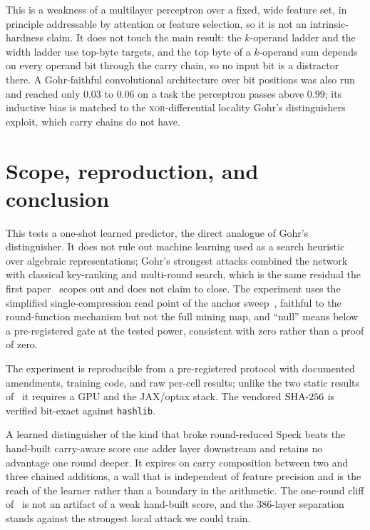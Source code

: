\documentclass[11pt]{article}
\begin{document}
This is a weakness of a multilayer perceptron over a fixed, wide feature
set, in principle addressable by attention or feature selection, so it is
not an intrinsic-hardness claim. It does not touch the main result: the
$k$-operand ladder and the width ladder use top-byte targets, and the top
byte of a $k$-operand sum depends on every operand bit through the carry
chain, so no input bit is a distractor there. A Gohr-faithful
convolutional architecture over bit positions was also run and reached only
$0.03$ to $0.06$ on a task the perceptron passes above $0.99$; its
inductive bias is matched to the \textsc{xor}-differential locality Gohr's
distinguishers exploit, which carry chains do not have.

\section{Scope, reproduction, and conclusion}\label{sec:scope}

This tests a one-shot learned predictor, the direct analogue of Gohr's
distinguisher. It does not rule out machine learning used as a search
heuristic over algebraic representations; Gohr's strongest attacks combined
the network with classical key-ranking and multi-round search, which is the
same residual the first paper~\cite{paperI} scopes out and does not claim
to close. The experiment uses the simplified single-compression read point
of the anchor sweep~\cite{paperII}, faithful to the round-function
mechanism but not the full mining map, and ``null'' means below a
pre-registered gate at the tested power, consistent with zero rather than a
proof of zero.

The experiment is reproducible from a pre-registered protocol with
documented amendments, training code, and raw per-cell results; unlike the
two static results of~\cite{paperII} it requires a GPU and the JAX/optax
stack. The vendored $\mathrm{SHA\text{-}256}$ is verified bit-exact against \texttt{hashlib}.

A learned distinguisher of the kind that broke round-reduced Speck beats
the hand-built carry-aware score one adder layer downstream and retains no
advantage one round deeper. It expires on carry composition
between two and three chained additions, a wall that is independent of
feature precision and is the reach of the learner rather than a boundary in
the arithmetic. The one-round cliff of~\cite{paperII} is not an artifact of
a weak hand-built score, and the $386$-layer separation stands against the
strongest local attack we could train.
\end{document}

